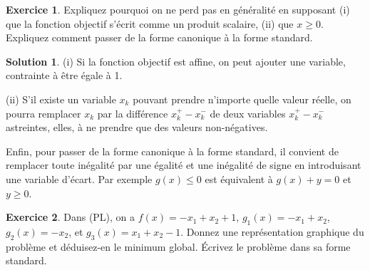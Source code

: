 \documentclass[a4paper,francais]{article}
\theoremstyle{definition}
\newtheorem{exercice}{Exercice}[section]
\newtheorem*{solution}{Solution}
\begin{document}
\begin{exercice}
  Expliquez pourquoi on ne perd pas en généralité en supposant (i)
  que la fonction objectif s'écrit comme un produit scalaire, (ii)
  que $x \geq 0$. 
  Expliquez comment passer de la forme canonique à la forme standard.
\end{exercice}

\begin{solution}
  (i) Si la fonction objectif est affine, on peut ajouter une variable,
  contrainte à être égale à 1. 
  
  (ii) S'il existe un variable $x_k$ pouvant prendre n'importe quelle valeur réelle,
  on pourra remplacer $x_k$ par la différence $x_k^+ - x_k^-$ de deux variables
  $x_k^+ - x_k^-$ astreintes, elles, à ne prendre que des valeurs non-négatives.

  Enfin, pour passer de la forme canonique à la forme standard, il convient de remplacer
  toute inégalité par une égalité et une inégalité de signe
  en introduisant une variable d'écart. Par exemple $g(x) \leq 0$ est équivalent
  à $g(x) + y = 0$ et $y \geq 0$.
\end{solution}

\begin{exercice}
  \label{ex:ex}
  Dans (PL), on a $f(x) = -x_1 + x_2 + 1$, $g_1(x) = -x_1 + x_2$, $g_2(x) = -x_2$, 
  et $g_3(x) = x_1 + x_2 - 1$. Donnez une représentation graphique du problème
  et déduisez-en le minimum global. \'Ecrivez le problème dans sa forme standard.
\end{exercice}
\end{document}
